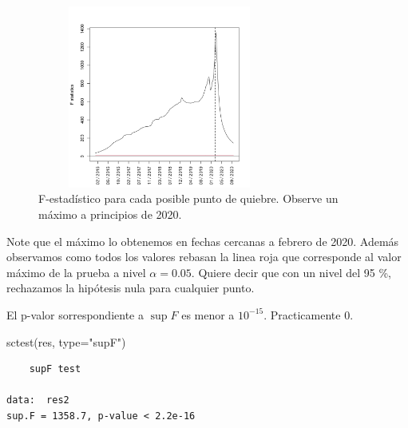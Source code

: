 \documentclass[
]{article}
\newenvironment{Shaded}{}{}
\newcommand{\AttributeTok}[1]{\textcolor[rgb]{0.49,0.56,0.16}{#1}}
\newcommand{\FunctionTok}[1]{\textcolor[rgb]{0.02,0.16,0.49}{#1}}
\newcommand{\NormalTok}[1]{#1}
\newcommand{\StringTok}[1]{\textcolor[rgb]{0.25,0.44,0.63}{#1}}
\begin{document}
\begin{figure}[h]
\centering
\includegraphics[width=8cm, height=6cm]{../plots/structChange_files/structChange_9_1.png}
\caption{F-estadístico para cada posible punto de quiebre. Observe un máximo a principios de 2020.}
\end{figure}

Note que el máximo lo obtenemos en fechas cercanas a febrero de 2020.
Además observamos como todos los valores rebasan la linea roja que
corresponde al valor máximo de la prueba a nivel \(\alpha=0.05\). Quiere
decir que con un nivel del 95 \%, rechazamos la hipótesis nula para
cualquier punto.

El p-valor sorrespondiente a \(\sup F\) es menor a \(10^{-15}\).
Practicamente 0.

\begin{Shaded}
\begin{Highlighting}[]
\FunctionTok{sctest}\NormalTok{(res, }\AttributeTok{type=}\StringTok{"supF"}\NormalTok{)}
\end{Highlighting}
\end{Shaded}

\begin{verbatim}
	supF test

data:  res2
sup.F = 1358.7, p-value < 2.2e-16
\end{verbatim}
\end{document}
